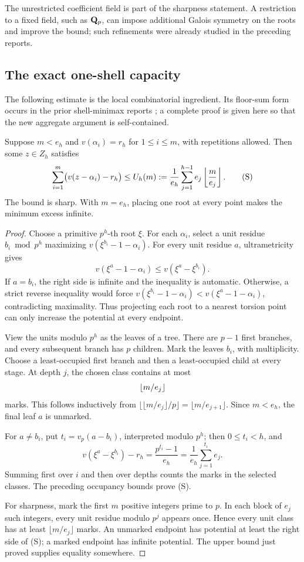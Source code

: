 The unrestricted coefficient field is part of the sharpness statement. A restriction to a fixed field, such as \(\mathbf Q_p\), can impose additional Galois symmetry on the roots and improve the bound; such refinements were already studied in the preceding reports.

\subsection{The exact one-shell capacity}
The following estimate is the local combinatorial ingredient. Its floor-sum form occurs in the prior shell-minimax reports \cite{shellprior,samplingprior}; a complete proof is given here so that the new aggregate argument is self-contained.

\begin{lemma}
\label{lem:shell}
Suppose \(m<e_h\) and \(v(\alpha_i)=r_h\) for \(1\le i\le m\), with repetitions allowed. Then some \(z\in Z_h\) satisfies
\[
 \sum_{i=1}^m\bigl(v(z-\alpha_i)-r_h\bigr)
 \le U_h(m):=\frac1{e_h}
 \sum_{j=1}^{h-1}e_j\left\lfloor \frac{m}{e_j}\right\rfloor.
 \tag{S}
\]
The bound is sharp. With \(m=e_h\), placing one root at every point makes the minimum excess infinite.
\end{lemma}

\begin{proof}
Choose a primitive \(p^h\)-th root \(\xi\). For each \(\alpha_i\), select a unit residue \(b_i\bmod p^h\) maximizing
\(v(\xi^{b_i}-1-\alpha_i)\).
For every unit residue \(a\), ultrametricity gives
\[
 v(\xi^a-1-\alpha_i)\le v(\xi^a-\xi^{b_i}).
\]
If \(a=b_i\), the right side is infinite and the inequality is automatic. Otherwise, a strict reverse inequality would force
\(v(\xi^{b_i}-1-\alpha_i)<v(\xi^a-1-\alpha_i)\), contradicting maximality. Thus projecting each root to a nearest torsion point can only increase the potential at every endpoint.

View the units modulo \(p^h\) as the leaves of a tree. There are \(p-1\) first branches, and every subsequent branch has \(p\) children. Mark the leaves \(b_i\), with multiplicity. Choose a least-occupied first branch and then a least-occupied child at every stage. At depth \(j\), the chosen class contains at most
\[
 \left\lfloor m/e_j\right\rfloor
\]
marks. This follows inductively from
\(\lfloor\lfloor m/e_j\rfloor/p\rfloor=\lfloor m/e_{j+1}\rfloor\).
Since \(m<e_h\), the final leaf \(a\) is unmarked.

For \(a\ne b_i\), put \(t_i=v_p(a-b_i)\), interpreted modulo \(p^h\); then \(0\le t_i<h\), and
\[
 v(\xi^a-\xi^{b_i})-r_h
 =\frac{p^{t_i}-1}{e_h}
 =\frac1{e_h}\sum_{j=1}^{t_i}e_j.
\]
Summing first over \(i\) and then over depths counts the marks in the selected classes. The preceding occupancy bounds prove (S).

For sharpness, mark the first \(m\) positive integers prime to \(p\). In each block of \(e_j\) such integers, every unit residue modulo \(p^j\) appears once. Hence every unit class has at least \(\lfloor m/e_j\rfloor\) marks. An unmarked endpoint has potential at least the right side of (S); a marked endpoint has infinite potential. The upper bound just proved supplies equality somewhere.
\end{proof}

